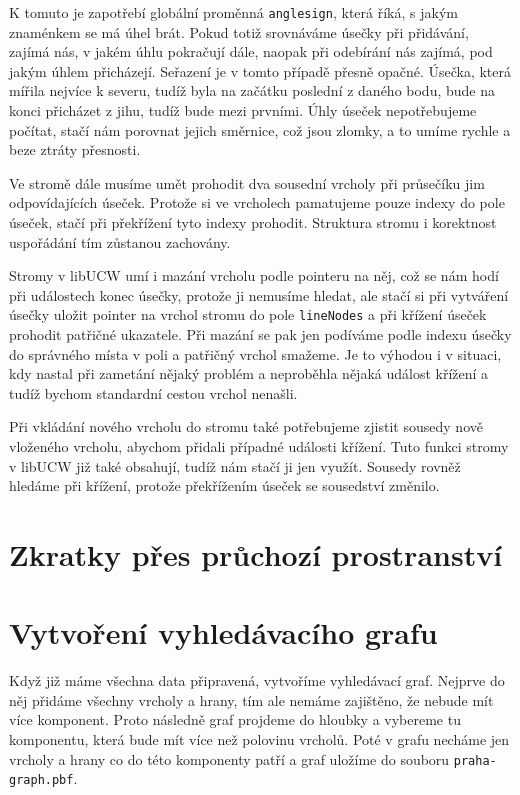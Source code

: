 K tomuto je zapotřebí globální proměnná \verb|anglesign|, která říká, s jakým
znaménkem se má úhel brát. Pokud totiž srovnáváme úsečky při přidávání, zajímá
nás, v jakém úhlu pokračují dále, naopak při odebírání nás zajímá, pod jakým
úhlem přicházejí. Seřazení je v tomto případě přesně opačné. Úsečka, která
mířila nejvíce k severu, tudíž byla na začátku poslední z daného bodu, bude na
konci přicházet z jihu, tudíž bude mezi prvními. Úhly úseček nepotřebujeme
počítat, stačí nám porovnat jejich směrnice, což jsou zlomky, a to umíme rychle
a beze ztráty přesnosti.

Ve stromě dále musíme umět prohodit dva sousední vrcholy při průsečíku jim
odpovídajících úseček. Protože si ve vrcholech pamatujeme pouze indexy do pole
úseček, stačí při překřížení tyto indexy prohodit. Struktura stromu i korektnost
uspořádání tím zůstanou zachovány.

Stromy v libUCW umí i mazání vrcholu podle pointeru na něj, což se nám hodí při
událostech konec úsečky, protože ji nemusíme hledat, ale stačí si při vytváření
úsečky uložit pointer na vrchol stromu do pole \verb|lineNodes| a při křížení
úseček prohodit patřičné ukazatele. Při mazání se pak jen podíváme podle indexu
úsečky do správného místa v poli a patřičný vrchol smažeme. Je to výhodou i v
situaci, kdy nastal při zametání nějaký problém a neproběhla nějaká událost
křížení a tudíž bychom standardní cestou vrchol nenašli.

Při vkládání nového vrcholu do stromu také potřebujeme zjistit sousedy nově
vloženého vrcholu, abychom přidali případné události křížení. Tuto funkci stromy
v libUCW již také obsahují, tudíž nám stačí ji jen využít. Sousedy rovněž
hledáme při křížení, protože překřížením úseček se sousedství změnilo.

\section{Zkratky přes průchozí prostranství}

\section{Vytvoření vyhledávacího grafu}
Když již máme všechna data připravená, vytvoříme vyhledávací graf. Nejprve do
něj přidáme všechny vrcholy a hrany, tím ale nemáme zajištěno, že nebude mít
více komponent. Proto následně graf projdeme do hloubky a vybereme tu
komponentu, která bude mít více než polovinu vrcholů. Poté v grafu necháme jen
vrcholy a hrany co do této komponenty patří a graf uložíme do souboru
\verb|praha-graph.pbf|. 
